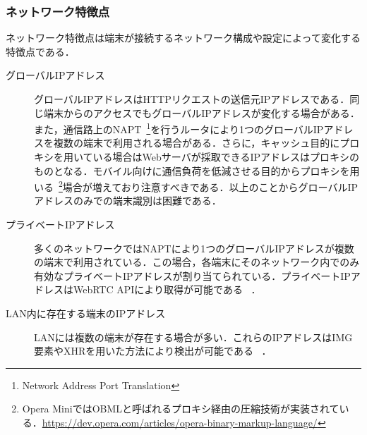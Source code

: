 \subsubsection{ネットワーク特徴点}
ネットワーク特徴点は端末が接続するネットワーク構成や設定によって変化する特徴点である．
\begin{description}
\item[グローバルIPアドレス]グローバルIPアドレスはHTTPリクエストの送信元IPアドレスである．同じ端末からのアクセスでもグローバルIPアドレスが変化する場合がある．また，通信路上のNAPT~\footnote{Network Address Port Translation}を行うルータにより1つのグローバルIPアドレスを複数の端末で利用される場合がある．さらに，キャッシュ目的にプロキシを用いている場合はWebサーバが採取できるIPアドレスはプロキシのものとなる．モバイル向けに通信負荷を低減させる目的からプロキシを用いる~\footnote{Opera MiniではOBMLと呼ばれるプロキシ経由の圧縮技術が実装されている．\url{https://dev.opera.com/articles/opera-binary-markup-language/}}場合が増えており注意すべきである．以上のことからグローバルIPアドレスのみでの端末識別は困難である．
\item[プライベートIPアドレス]多くのネットワークではNAPTにより1つのグローバルIPアドレスが複数の端末で利用されている．この場合，各端末にそのネットワーク内でのみ有効なプライベートIPアドレスが割り当てられている．プライベートIPアドレスはWebRTC APIにより取得が可能である~\cite{細井理央2015ブラウザが属するネットワークの情報を採取する} ．
\item[LAN内に存在する端末のIPアドレス]LANには複数の端末が存在する場合が多い．これらのIPアドレスはIMG要素やXHRを用いた方法により検出が可能である~\cite{細井理央2015ブラウザが属するネットワークの情報を採取する} ．
\end{description}
